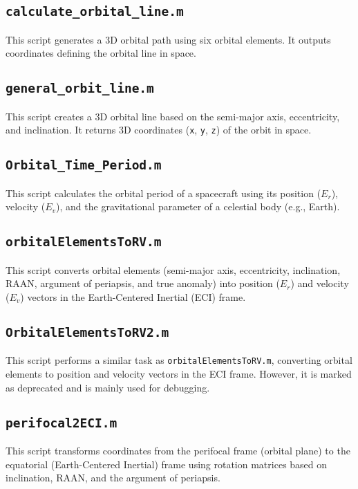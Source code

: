 \documentclass{article}
\begin{document}
	\subsection{\texttt{calculate\_orbital\_line.m}}
	This script generates a 3D orbital path using six orbital elements.
	It outputs coordinates defining the orbital line in space.
	
	\subsection{\texttt{general\_orbit\_line.m}}
	This script creates a 3D orbital line based on the semi-major axis, eccentricity, and inclination. It returns 3D coordinates (\texttt{x}, \texttt{y}, \texttt{z}) of the orbit in space.
	
	\subsection{\texttt{Orbital\_Time\_Period.m}}
	This script calculates the orbital period of a spacecraft using its position (\texttt{$E_r$}), velocity (\texttt{$E_v$}), and the gravitational parameter of a celestial body (e.g., Earth).
	
	\subsection{\texttt{orbitalElementsToRV.m}}
	This script converts orbital elements (semi-major axis, eccentricity, inclination, RAAN, argument of periapsis, and true anomaly) into position (\texttt{$E_r$}) and velocity (\texttt{$E_v$}) vectors in the Earth-Centered Inertial (ECI) frame.
	
	\subsection{\texttt{OrbitalElementsToRV2.m}}
	This script performs a similar task as \texttt{orbitalElementsToRV.m}, converting orbital elements to position and velocity vectors in the ECI frame. However, it is marked as deprecated and is mainly used for debugging.
	
	\subsection{\texttt{perifocal2ECI.m}}
	This script transforms coordinates from the perifocal frame (orbital plane) to the equatorial (Earth-Centered Inertial) frame using rotation matrices based on inclination, RAAN, and the argument of periapsis.
	
\end{document}

